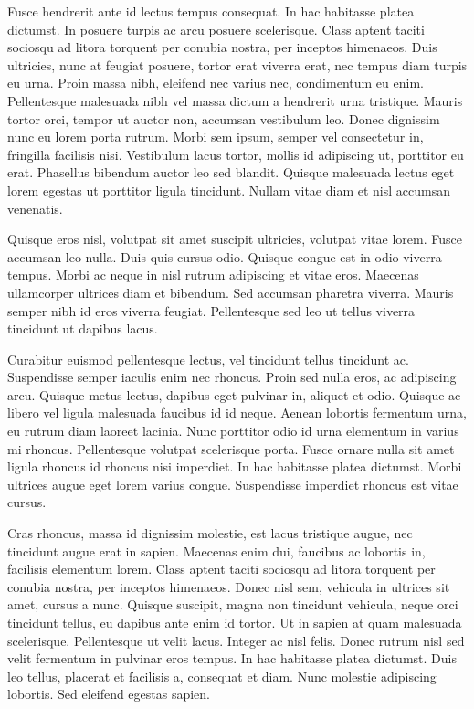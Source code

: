 Fusce hendrerit ante id lectus tempus consequat. In hac habitasse platea dictumst. In posuere turpis ac arcu posuere scelerisque. Class aptent taciti sociosqu ad litora torquent per conubia nostra, per inceptos himenaeos. Duis ultricies, nunc at feugiat posuere, tortor erat viverra erat, nec tempus diam turpis eu urna. Proin massa nibh, eleifend nec varius nec, condimentum eu enim. Pellentesque malesuada nibh vel massa dictum a hendrerit urna tristique. Mauris tortor orci, tempor ut auctor non, accumsan vestibulum leo. Donec dignissim nunc eu lorem porta rutrum. Morbi sem ipsum, semper vel consectetur in, fringilla facilisis nisi. Vestibulum lacus tortor, mollis id adipiscing ut, porttitor eu erat. Phasellus bibendum auctor leo sed blandit. Quisque malesuada lectus eget lorem egestas ut porttitor ligula tincidunt. Nullam vitae diam et nisl accumsan venenatis.

Quisque eros nisl, volutpat sit amet suscipit ultricies, volutpat vitae lorem. Fusce accumsan leo nulla. Duis quis cursus odio. Quisque congue est in odio viverra tempus. Morbi ac neque in nisl rutrum adipiscing et vitae eros. Maecenas ullamcorper ultrices diam et bibendum. Sed accumsan pharetra viverra. Mauris semper nibh id eros viverra feugiat. Pellentesque sed leo ut tellus viverra tincidunt ut dapibus lacus.

Curabitur euismod pellentesque lectus, vel tincidunt tellus tincidunt ac. Suspendisse semper iaculis enim nec rhoncus. Proin sed nulla eros, ac adipiscing arcu. Quisque metus lectus, dapibus eget pulvinar in, aliquet et odio. Quisque ac libero vel ligula malesuada faucibus id id neque. Aenean lobortis fermentum urna, eu rutrum diam laoreet lacinia. Nunc porttitor odio id urna elementum in varius mi rhoncus. Pellentesque volutpat scelerisque porta. Fusce ornare nulla sit amet ligula rhoncus id rhoncus nisi imperdiet. In hac habitasse platea dictumst. Morbi ultrices augue eget lorem varius congue. Suspendisse imperdiet rhoncus est vitae cursus.

Cras rhoncus, massa id dignissim molestie, est lacus tristique augue, nec tincidunt augue erat in sapien. Maecenas enim dui, faucibus ac lobortis in, facilisis elementum lorem. Class aptent taciti sociosqu ad litora torquent per conubia nostra, per inceptos himenaeos. Donec nisl sem, vehicula in ultrices sit amet, cursus a nunc. Quisque suscipit, magna non tincidunt vehicula, neque orci tincidunt tellus, eu dapibus ante enim id tortor. Ut in sapien at quam malesuada scelerisque. Pellentesque ut velit lacus. Integer ac nisl felis. Donec rutrum nisl sed velit fermentum in pulvinar eros tempus. In hac habitasse platea dictumst. Duis leo tellus, placerat et facilisis a, consequat et diam. Nunc molestie adipiscing lobortis. Sed eleifend egestas sapien.

